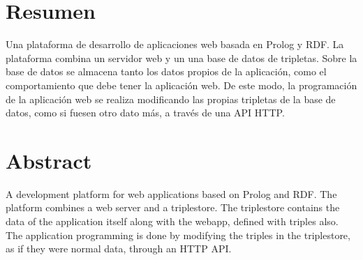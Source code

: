 \documentclass[openright,twoside,12pt]{book}
\begin{document}
\newpage
\mbox{}	
\thispagestyle{empty} %


\chapter*{Resumen} %
\begin{flushleft}
Una plataforma de desarrollo de aplicaciones web basada en Prolog y RDF. La plataforma combina un servidor web y un una base de datos de tripletas. Sobre la base de datos se almacena tanto los datos propios de la aplicación, como el comportamiento que debe tener la aplicación web. De este modo, la programación de la aplicación web se realiza modificando las propias tripletas de la base de datos, como si fuesen otro dato más, a través de una API HTTP.
\end{flushleft}


\chapter*{Abstract} %
\begin{flushleft}
A development platform for web applications based on Prolog and RDF. The platform combines a web server and a triplestore. The triplestore contains the data of the application itself along with the webapp, defined with triples also. The application programming is done by modifying the triples in the triplestore, as if they were normal data, through an HTTP API.
\end{flushleft}

\tableofcontents
\end{document}
